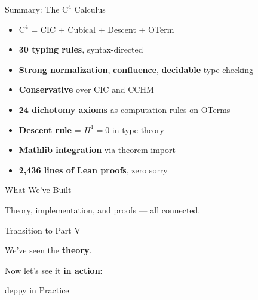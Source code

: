 \documentclass[aspectratio=169,11pt]{beamer}
\newcommand{\Cfour}{\mathrm{C}^4}
\begin{document}
\begin{frame}{Summary: The $\Cfour$ Calculus}
\begin{itemize}
\item $\Cfour$ = CIC + Cubical + Descent + OTerm
\item \textbf{30 typing rules}, syntax-directed
\item \textbf{Strong normalization}, \textbf{confluence}, \textbf{decidable} type checking
\item \textbf{Conservative} over CIC and CCHM
\item \textbf{24 dichotomy axioms} as computation rules on OTerms
\item \textbf{Descent rule} = $H^1 = 0$ in type theory
\item \textbf{Mathlib integration} via theorem import
\item \textbf{2,436 lines of Lean proofs}, zero sorry
\end{itemize}
\end{frame}

\begin{frame}{What We've Built}
\begin{center}
\end{center}

\vspace{0.3em}
Theory, implementation, and proofs --- all connected.
\end{frame}

\begin{frame}{Transition to Part V}
\begin{center}
{\Large We've seen the \textbf{theory}.}

\vspace{1em}
Now let's see it \textbf{in action}:

\vspace{1em}
{\LARGE\color{blue} deppy in Practice}
\end{center}
\end{frame}
\end{document}
